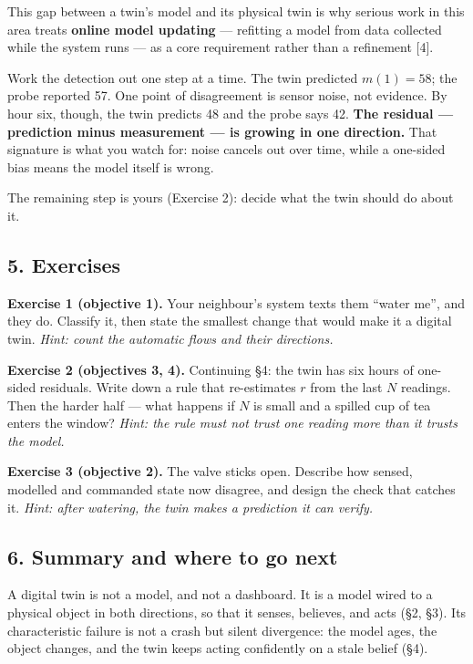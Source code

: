 \documentclass[
  12pt,
  a4paper,
]{article}
\begin{document}
This gap between a twin's model and its physical twin is why serious
work in this area treats \textbf{online model updating} --- refitting a
model from data collected while the system runs --- as a core
requirement rather than a refinement {[}4{]}.

Work the detection out one step at a time. The twin predicted
\(m(1) = 58\); the probe reported 57. One point of disagreement is
sensor noise, not evidence. By hour six, though, the twin predicts 48
and the probe says 42. \textbf{The residual --- prediction minus
measurement --- is growing in one direction.} That signature is what you
watch for: noise cancels out over time, while a one-sided bias means the
model itself is wrong.

The remaining step is yours (Exercise 2): decide what the twin should do
about it.

\subsection{5. Exercises}\label{exercises}

\textbf{Exercise 1 (objective 1).} Your neighbour's system texts them
``water me'', and they do. Classify it, then state the smallest change
that would make it a digital twin. \emph{Hint: count the automatic flows
and their directions.}

\textbf{Exercise 2 (objectives 3, 4).} Continuing §4: the twin has six
hours of one-sided residuals. Write down a rule that re-estimates \(r\)
from the last \(N\) readings. Then the harder half --- what happens if
\(N\) is small and a spilled cup of tea enters the window? \emph{Hint:
the rule must not trust one reading more than it trusts the model.}

\textbf{Exercise 3 (objective 2).} The valve sticks open. Describe how
sensed, modelled and commanded state now disagree, and design the check
that catches it. \emph{Hint: after watering, the twin makes a prediction
it can verify.}

\subsection{6. Summary and where to go
next}\label{summary-and-where-to-go-next}

A digital twin is not a model, and not a dashboard. It is a model wired
to a physical object in both directions, so that it senses, believes,
and acts (§2, §3). Its characteristic failure is not a crash but silent
divergence: the model ages, the object changes, and the twin keeps
acting confidently on a stale belief (§4).
\end{document}
